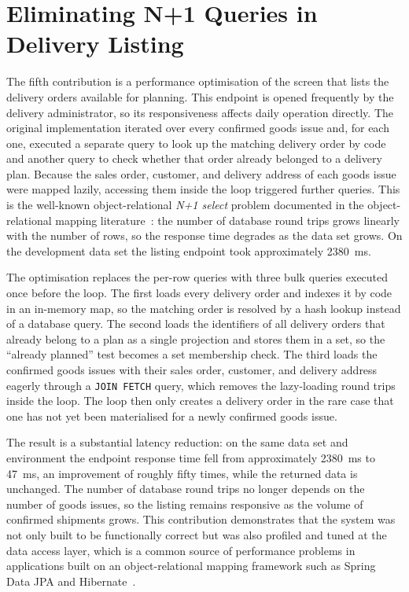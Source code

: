 \section{Eliminating N+1 Queries in Delivery Listing}
The fifth contribution is a performance optimisation of the screen that lists the
delivery orders available for planning. This endpoint is opened frequently by the
delivery administrator, so its responsiveness affects daily operation directly.
The original implementation iterated over every confirmed goods issue and, for
each one, executed a separate query to look up the matching delivery order by
code and another query to check whether that order already belonged to a delivery
plan. Because the sales order, customer, and delivery address of each goods issue
were mapped lazily, accessing them inside the loop triggered further queries. This
is the well-known object-relational \emph{N+1 select} problem documented in the
object-relational mapping literature~\cite{bauer2015hibernate}: the number of
database round trips grows linearly with the number of rows, so the response time
degrades as the data set grows. On the development data set the listing endpoint
took approximately 2380~ms.

The optimisation replaces the per-row queries with three bulk queries executed
once before the loop. The first loads every delivery order and indexes it by code
in an in-memory map, so the matching order is resolved by a hash lookup instead of
a database query. The second loads the identifiers of all delivery orders that
already belong to a plan as a single projection and stores them in a set, so the
``already planned'' test becomes a set membership check. The third loads the
confirmed goods issues with their sales order, customer, and delivery address
eagerly through a \texttt{JOIN FETCH} query, which removes the lazy-loading round
trips inside the loop. The loop then only creates a delivery order in the rare
case that one has not yet been materialised for a newly confirmed goods issue.

The result is a substantial latency reduction: on the same data set and
environment the endpoint response time fell from approximately 2380~ms to
47~ms, an improvement of roughly fifty times, while the returned data is
unchanged. The number of database round trips no longer depends on the number of
goods issues, so the listing remains responsive as the volume of confirmed
shipments grows. This contribution demonstrates that the system was not only
built to be functionally correct but was also profiled and tuned at the data
access layer, which is a common source of performance problems in applications
built on an object-relational mapping framework such as Spring Data JPA and
Hibernate~\cite{springboot314}.
